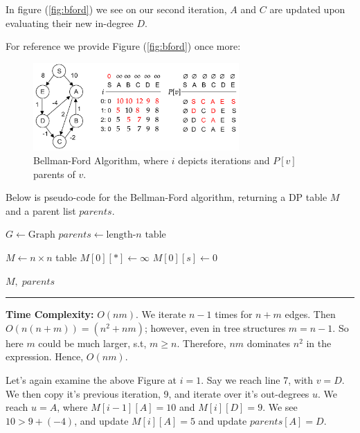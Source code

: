 \noindent
In figure (\ref{fig:bford}) we see on our second iteration, $A$ and $C$ are updated upon evaluating their new in-degree $D$.
\newpage

\noindent
For reference we provide Figure (\ref{fig:bford}) once more:
\begin{figure}[h]
    \centering
    \includegraphics[width=0.7\textwidth]{Sections/dp/bford.png}
    \caption{Bellman-Ford Algorithm, where $i$ depicts iterations and $P[v]$ parents of $v$.}
\end{figure}

\noindent
Below is pseudo-code for the Bellman-Ford algorithm, returning a DP table $M$ and a parent list $parents$.
\begin{Func}

    \vspace{-.5em}
    \begin{algorithm}[H]
        $G \gets \text{Graph}$ 
        $parents \gets \text{length-}n \text{ table}$ 
        
        $M \gets n \times n$ table 
        $M[0][*] \gets \infty$ 
        $M[0][s] \gets 0$ 
        
        
        \Return $M, \; parents$\;
    \end{algorithm}
    
    \noindent
    \rule{\textwidth}{0.4pt}
    \textbf{Time Complexity:} $O(nm)$. We iterate $n-1$ times for $n+m$ edges. Then $O(n(n+m))=(n^2 + nm)$; however,
    even in tree structures $m=n-1$. So here $m$ could be much larger, s.t, $m\geq n$. Therefore, $nm$ dominates $n^2$
    in the expression. Hence, $O(nm)$.
\end{Func}
\noindent
Let's again examine the above Figure at $i=1$. Say we reach line 7, with $v=D$. We then copy it's previous iteration,
9, and iterate over it's out-degrees $u$. We reach $u=A$, where $M[i-1][A]=10$ and $M[i][D]=9$. We see $10>9+(-4)$,
and update $M[i][A]=5$ and update $parents[A]=D$.

